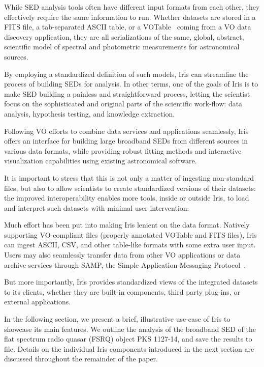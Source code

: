\documentclass[preprint,authoryear,5p]{elsarticle}
\begin{document}
While SED analysis tools often have different input formats from each other,
they effectively require the same information to run. Whether datasets are
stored in a FITS file, a tab-separated ASCII table, or a VOTable~\citep{2011arXiv1110.0524O} coming from a
VO data discovery application, they are all serializations of the same, global,
abstract, scientific model of spectral and photometric measurements for
astronomical sources.

By employing a standardized definition of such models, Iris can streamline
the process of building SEDs for analysis. In other terms, one of the goals of
Iris is to make SED building a painless and straightforward process, letting the
scientist focus on the sophisticated and original parts of the scientific
work-flow: data analysis, hypothesis testing, and knowledge extraction.

Following VO efforts to combine data services and applications seamlessly, Iris
offers an interface for building large broadband SEDs from different sources in
various data formats, while providing robust fitting methods and interactive
visualization capabilities using existing astronomical software.

It is important to stress that this is not only a matter of ingesting
non-standard files, but also to allow scientists to create standardized versions
of their datasets: the improved interoperability enables more tools, inside or
outside Iris, to load and interpret such datasets with minimal user
intervention.

\begin{sloppypar}
Much effort has been put into making Iris lenient on the data format. Natively
supporting VO-compliant files (properly annotated
VOTable and FITS files), Iris can ingest ASCII, CSV,
and other table-like formats with some extra user input. Users may also
seamlessly transfer data from other VO applications or data archive services
through SAMP, the Simple Application Messaging
Protocol~\citep{2011arXiv1110.0528T}.
\end{sloppypar}

But more importantly, Iris provides standardized views of the integrated
datasets to its clients, whether they are built-in components, third party
plug-ins, or external applications.

In the following section, we present a brief, illustrative use-case
of Iris to showcase its main features. We outline the analysis of the broadband SED
of the flat spectrum radio quasar (FSRQ) object PKS 1127-14, and save the
results to file. Details on the individual Iris components introduced in the next section 
are discussed throughout the remainder of the paper.
\end{document}
